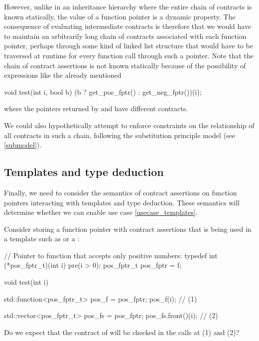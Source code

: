 However, unlike in an inheritance hierarchy where the entire chain of contracts is known statically, the value of a function pointer is a dynamic property. The consequence of evaluating intermediate contracts is therefore that we would have to maintain an arbitrarily long chain of contracts associated with each function pointer, perhaps through some kind of linked list structure that would have to be traversed at runtime for every function call through such a pointer. Note that the chain of contract assertions is not known statically because of the possibility of expressions like the already mentioned 
\begin{codeblock}
void test(int i, bool b) {
  (b ? get_pos_fptr() : get_neg_fptr())(i);
}
\end{codeblock}
where the pointers returned by  and  have different contracts.

We could also hypothetically attempt to enforce constraints on the relationship of all contracts in such a chain, following the substitution principle model (see \ref{submodel}).


\subsection{Templates and type deduction}
\label{semantic_templates}

Finally, we need to consider the semantics of contract assertions on function pointers interacting with templates and type deduction. These semantics will determine whether we can enable use case \ref{usecase_templates}.

Consider storing a function pointer with contract assertions that is being used in a template such as  or a :
\begin{codeblock}
// Pointer to function that accepts only positive numbers:
typedef int (*pos_fptr_t)(int i) pre(i > 0);
pos_fptr_t pos_fptr = f;

void test(int i) {
  std::function<pos_fptr_t> pos_f = pos_fptr;
  pos_f(i);  // (1)
  
  std::vector<pos_fptr_t> pos_fs = {pos_fptr};
  pos_fs.front()(i);  // (2)
}
\end{codeblock}
Do we expect that the contract of  will be checked in the calls at (1) and (2)?

